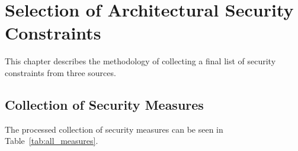 \chapter{Selection of Architectural Security Constraints}

This chapter describes the methodology of collecting a final list of security constraints from three sources. 

\section{Collection of Security Measures}

The processed collection of security measures can be seen in Table~\ref{tab:all_measures}.

